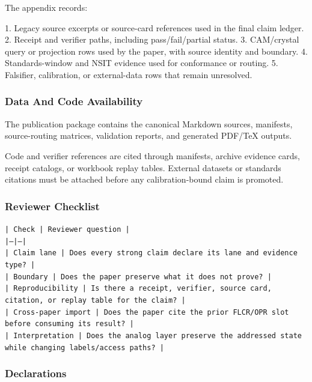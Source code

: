 \documentclass[11pt]{article}
\begin{document}
The appendix records:

1. Legacy source excerpts or source-card references used in the final claim ledger.
2. Receipt and verifier paths, including pass/fail/partial status.
3. CAM/crystal query or projection rows used by the paper, with source identity and boundary.
4. Standards-window and NSIT evidence used for conformance or routing.
5. Falsifier, calibration, or external-data rows that remain unresolved.

\subsubsection*{Data And Code Availability}

The publication package contains the canonical Markdown sources, manifests, source-routing matrices, validation reports, and generated PDF/TeX outputs.

Code and verifier references are cited through manifests, archive evidence cards, receipt catalogs, or workbook replay tables. External datasets or
standards citations must be attached before any calibration-bound claim is
promoted.

\subsubsection*{Reviewer Checklist}

\noindent\texttt{| Check | Reviewer question |}\\
\noindent\texttt{|---|---|}\\
\noindent\texttt{| Claim lane | Does every strong claim declare its lane and evidence type? |}\\
\noindent\texttt{| Boundary | Does the paper preserve what it does not prove? |}\\
\noindent\texttt{| Reproducibility | Is there a receipt, verifier, source card, citation, or replay table for the claim? |}\\
\noindent\texttt{| Cross-paper import | Does the paper cite the prior FLCR/OPR slot before consuming its result? |}\\
\noindent\texttt{| Interpretation | Does the analog layer preserve the addressed state while changing labels/access paths? |}\\

\subsubsection*{Declarations}
\end{document}
